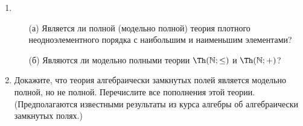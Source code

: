\documentclass[a4paper,11pt]{article}
\begin{document}
\begin{enumerate}
\item \begin{enumerate}
	\item[(а)] Является ли полной (модельно полной) теория плотного неодноэлементного порядка  с наибольшим и наименьшим элементами?
	\item[(б)] Являются ли модельно полными теории $\Th(\mathbb{N};\leq)$ и $\Th(\mathbb{N};+)$?
\end{enumerate}

\item Докажите, что теория алгебраически замкнутых полей является модельно полной, но не полной. Перечислите все пополнения этой теории. (Предполагаются известными результаты из курса алгебры об алгебраически замкнутых полях.) 
\end{enumerate}
\end{document}

